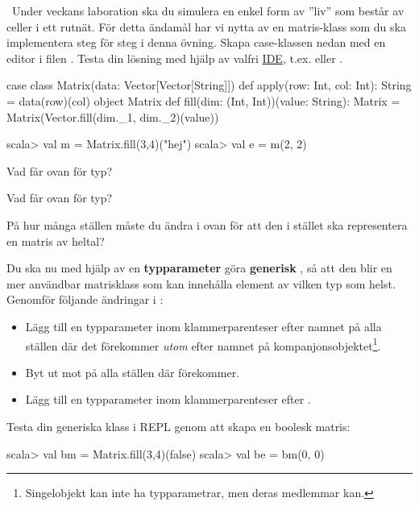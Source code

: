 \Task\label{exe:matrices:labprep}  \what~Under veckans laboration ska du simulera en enkel form av ''liv'' som består av celler i ett rutnät. För detta ändamål har vi nytta av en matris-klass som du ska implementera steg för steg i denna övning.
Skapa case-klassen nedan med en editor i filen . Testa din lösning med hjälp av valfri \hyperref[appendix:ide]{IDE}, t.ex.  eller .
\begin{Code}
case class Matrix(data: Vector[Vector[String]]){
  def apply(row: Int, col: Int): String = data(row)(col)
}
object Matrix {
  def fill(dim: (Int, Int))(value: String): Matrix =
    Matrix(Vector.fill(dim._1, dim._2)(value))
}
\end{Code}

\begin{REPLnonum}
scala> val m = Matrix.fill(3,4)("hej")
scala> val e = m(2, 2)
\end{REPLnonum}

\Subtask Vad får  ovan för typ?

\Subtask Vad får  ovan för typ?

\Subtask På hur många ställen måste du ändra i  ovan för att den i stället ska representera en matris av heltal?

\Subtask Du ska nu med hjälp av en \textbf{typparameter} göra  \textbf{generisk} , så att den blir en mer användbar matrisklass som kan innehålla element av vilken typ som helst. Genomför följande ändringar i :

\begin{itemize}[noitemsep, nolistsep]
  \item Lägg till en typparameter  inom klammerparenteser efter namnet  på alla ställen där det förekommer \emph{utom} efter namnet på kompanjonsobjektet\footnote{Singelobjekt kan inte ha typparametrar, men deras medlemmar kan.}.
  \item Byt ut  mot  på alla ställen där  förekommer.
  \item Lägg till en typparameter  inom klammerparenteser efter .
\end{itemize}
Testa din generiska klass i REPL genom att skapa en boolesk matris:
\begin{REPLnonum}
scala> val bm = Matrix.fill(3,4)(false)
scala> val be = bm(0, 0)
\end{REPLnonum}

